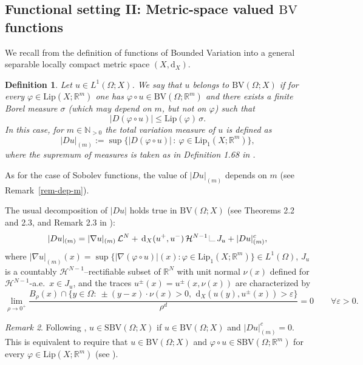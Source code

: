 \documentclass[a4paper,reqno]{amsart}
\newcommand\R{\mathbb{R}}
\newcommand\N{\mathbb{N}}
\newcommand{\BV}{\mathrm{BV}}
\newcommand{\SBV}{\mathrm{SBV}}
\newcommand{\dX}{\mathrm{d}_X}
\newcommand\calH{\mathcal{H}}
\newcommand\calE{\mathcal{E}}
\newcommand\calL{\mathcal{L}}
\newcommand\eps{{\varepsilon}}
\newcommand\dix{{\,\mathrm{d}_X}}
\newcommand{\LM}[1]{\hbox{\vrule width.2pt \vbox to#1pt{\vfill \hrule width#1pt height.2pt}}}
\newcommand{\LL}{{\mathchoice
{\,\LM7\,}{\,\LM7\,}{\,\LM5\,}{\,\LM{3.35}\,}}}
\newtheorem{definition}{Definition}[section]
\theoremstyle{remark}
\newtheorem{remark}[definition]{Remark}
\newcommand{\Lip}{\mathrm{Lip}}
\numberwithin{equation}{section}
\begin{document}
\subsection{Functional setting II: Metric-space valued $\BV$ functions}
We recall from \cite{Amb90SBVX} the definition of functions of Bounded Variation into a general separable locally compact metric space $(X,\dX)$. 
\begin{definition}
	\label{def-BV-metric}
	Let 
	$u\in L^1(\Omega ; X)$. We say that $u$ belongs to $\BV(\Omega; X)$ if for every $\varphi \in \Lip(X;\R^m)$ one has $\varphi\circ u \in \BV(\Omega;\R^m	)$ and there exists a finite Borel measure $\sigma$
(which may depend on $m$, but not on $\varphi$)
	such that
	\begin{equation}\label{f:BVX}
		|D(\varphi\circ u)| \leq \Lip(\varphi) \,\sigma.
	\end{equation}
In this case,
for $m\in\N_{>0}$
the total variation measure of $u$ is defined as
	\begin{equation}
		\label{eq-sup-measures}
		|D u|_{(m)}:=\sup\{|D(\varphi\circ u)|\,:\ \varphi\in \Lip_1(X;\R^m)\},
	\end{equation}
	where the supremum of measures is taken as in Definition 1.68 in \cite{AmbFusPal00}.
\end{definition}
As for the case of Sobolev functions, the value of $|Du|_{(m)}$ depends on $m$ (see Remark~\ref{rem-dep-m}).

The usual decomposition of $|Du|$ holds true in $\BV(\Omega;X)$ (see Theorems 2.2 and 2.3, and Remark 2.3 in \cite{Amb90SBVX}):
\begin{equation}
	\label{eq-gradu-decomposition}
	|Du|_{(m)}= |\nabla u|_{(m)} \,\calL^N + \dix(u^+,u^-) \, \calH^{N-1}\LL J_u + |Du|_{(m)}^c,
\end{equation}
where $ |\nabla u|_{(m)} (x)=\sup\{|\nabla(\varphi\circ u)|(x) \colon \varphi\in \Lip_1(X;\R^m) \}\in L^1(\Omega)$,
$J_u$ is a countably $\calH^{N-1}$--rectifiable subset of $\R^N$ with unit normal $\nu(x)$ defined for $\calH^{N-1}$-a.e.\ $x \in J_u$, and the traces $u^\pm(x)=u^\pm(x, \nu(x))$ are characterized by
\begin{equation}\label{f:upm}
\lim_{\rho \to 0^+} \frac{B_\rho(x) \cap \{y\in\Omega \colon\ \pm(y-x)\cdot \nu(x)>0,\ \dix(u(y),u^\pm(x))>\eps\}}{\rho^d}=0 \qquad \forall \eps>0.
\end{equation}


\begin{remark}
	\label{rem-BV-SBV}
	Following \cite{Amb90SBVX}, $u\in \SBV(\Omega; X)$ if $u\in \BV(\Omega; X)$ and $|Du|^c_{(m)}=0$. This is equivalent to require that $u\in \BV(\Omega; X)$ and  $\varphi\circ u\in \SBV(\Omega; \R^m)$ for every $\varphi\in \Lip(X;\R^m)$ (see
\cite[Remark 2.4]{Amb90SBVX}). 
		\end{remark}
	
\end{document}
